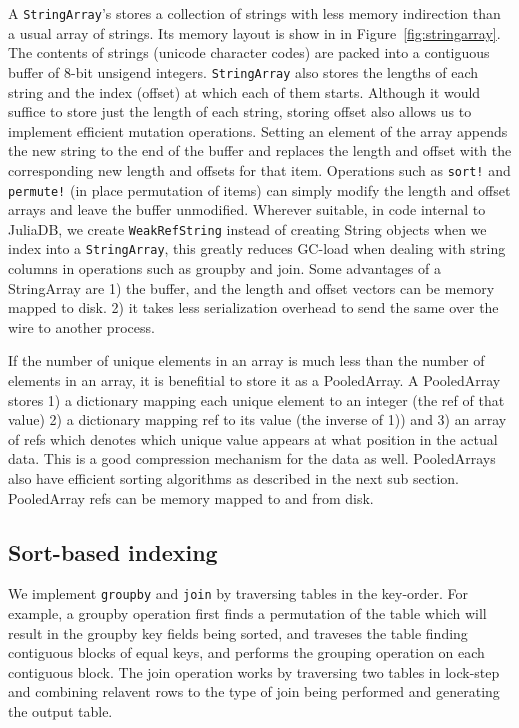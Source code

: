 \documentclass{juliacon}
\begin{document}
A \texttt{StringArray}'s stores a collection of strings with less memory indirection than a usual array of strings. Its memory layout is show in in Figure~\ref{fig:stringarray}. The contents of strings (unicode character codes) are packed into a contiguous buffer of 8-bit unsigend integers. \texttt{StringArray} also stores the lengths of each string and the index (offset) at which each of them starts. Although it would suffice to store just the length of each string, storing offset also allows us to implement efficient mutation operations. Setting an element of the array appends the new string to the end of the buffer and replaces the length and offset with the corresponding new length and offsets for that item. Operations such as \texttt{sort!} and \texttt{permute!} (in place permutation of items) can simply modify the length and offset arrays and leave the buffer unmodified. Wherever suitable, in code internal to JuliaDB, we create \texttt{WeakRefString} instead of creating String objects when we index into a \texttt{StringArray}, this greatly reduces GC-load when dealing with string columns in operations such as groupby and join. Some advantages of a StringArray are 1) the buffer, and the length and offset vectors can be memory mapped to disk. 2) it takes less serialization overhead to send the same over the wire to another process.

If the number of unique elements in an array is much less than the number of elements in an array, it is benefitial to store it as a PooledArray. A PooledArray stores 1) a dictionary mapping each unique element to an integer (the ref of that value) 2) a dictionary mapping ref to its value (the inverse of 1)) and 3) an array of refs which denotes which unique value appears at what position in the actual data. This is a good compression mechanism for the data as well. PooledArrays also have efficient sorting algorithms as described in the next sub section. PooledArray refs can be memory mapped to and from disk.

\subsection{Sort-based indexing}
\label{sec:sort}

We implement \texttt{groupby} and \texttt{join} by traversing tables in the key-order. For example, a groupby operation first finds a permutation of the table which will result in the groupby key fields being sorted, and traveses the table finding contiguous blocks of equal keys, and performs the grouping operation on each contiguous block. The join operation works by traversing two tables in lock-step and combining relavent rows to the type of join being performed and generating the output table.
\end{document}
